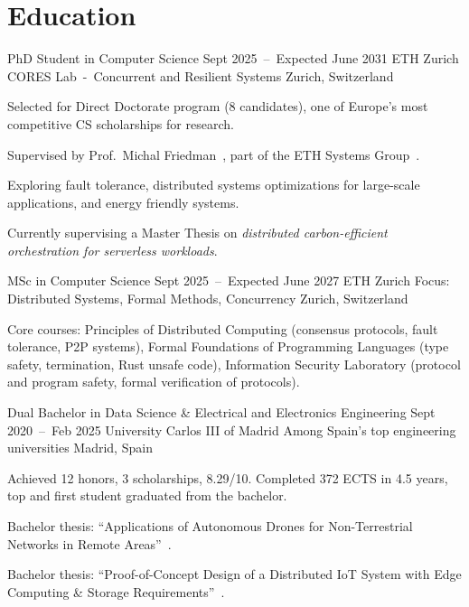 \documentclass[a4paper]{article}
\begin{document}
\makecvheader[L]%

\makecvfooter%
{}
{}
{}

\section{Education}

\begin{cvitemizeentry}%
  {PhD Student in Computer Science}
  {Sept 2025~--~Expected June 2031}
  {ETH Zurich}
  {CORES Lab~-~Concurrent and Resilient Systems }
  {Zurich, Switzerland}
  \item Selected for Direct Doctorate program (8 candidates), one of Europe's most competitive CS scholarships for research.
  \item Supervised by Prof.~Michal Friedman~, part of the ETH Systems Group~.
  \item Exploring fault tolerance, distributed systems optimizations for large-scale applications, and energy friendly systems.
  \item Currently supervising a Master Thesis on \textit{distributed carbon-efficient orchestration for serverless workloads}.
\end{cvitemizeentry}

\begin{cvitemizeentry}%
  {MSc in Computer Science}
  {Sept 2025~--~Expected June 2027}
  {ETH Zurich}
  {Focus: Distributed Systems, Formal Methods, Concurrency}
  {Zurich, Switzerland}
  \item Core courses: Principles of Distributed Computing (consensus protocols, fault tolerance, P2P systems),
  Formal Foundations of Programming Languages (type safety, termination, Rust unsafe code),
  Information Security Laboratory (protocol and program safety, formal verification of protocols).
\end{cvitemizeentry}

\begin{cvitemizeentry}%
  {Dual Bachelor in Data Science \& Electrical and Electronics Engineering}
  {Sept 2020~--~Feb 2025}
  {University Carlos III of Madrid}
  {Among Spain's top engineering universities}
  {Madrid, Spain}
  \item Achieved 12 honors, 3 scholarships, 8.29/10. Completed 372 ECTS in 4.5 years, top and first student graduated from the bachelor.
  \item Bachelor thesis: ``Applications of Autonomous Drones for Non-Terrestrial Networks in Remote Areas''~.
  \item Bachelor thesis: ``Proof-of-Concept Design of a Distributed IoT System with Edge Computing \& Storage Requirements''~.
\end{cvitemizeentry}
\end{document}
